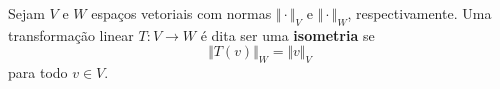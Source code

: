 \begin{definition}
	Sejam $V$ e $W$ espaços vetoriais com normas $\Vert\cdot\Vert_V$ e $\Vert\cdot\Vert_W$, respectivamente. Uma transformação linear $T\colon V\to W$ é dita ser uma \textbf{isometria} se
	\[\Vert T(v)\Vert_W=\Vert v\Vert_V\]
	para todo $v\in V$.
\end{definition}